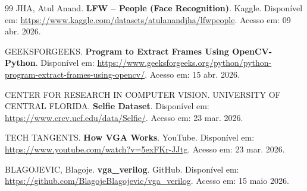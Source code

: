 \begin{thebibliography}{99}
JHA, Atul Anand.
\textbf{LFW -- People (Face Recognition)}.
Kaggle.
Disponível em:
\url{https://www.kaggle.com/datasets/atulanandjha/lfwpeople}.
Acesso em: 09 abr. 2026.

GEEKSFORGEEKS.
\textbf{Program to Extract Frames Using OpenCV-Python}.
Disponível em:
\url{https://www.geeksforgeeks.org/python/python-program-extract-frames-using-opencv/}.
Acesso em: 15 abr. 2026.

CENTER FOR RESEARCH IN COMPUTER VISION.
UNIVERSITY OF CENTRAL FLORIDA.
\textbf{Selfie Dataset}.
Disponível em:
\url{https://www.crcv.ucf.edu/data/Selfie/}.
Acesso em: 23 mar. 2026.

TECH TANGENTS.
\textbf{How VGA Works}.
YouTube.
Disponível em:
\url{https://www.youtube.com/watch?v=5exFKr-JJtg}.
Acesso em: 23 mar. 2026.

BLAGOJEVIC, Blagoje.
\textbf{vga\_verilog}.
GitHub.
Disponível em:
\url{https://github.com/BlagojeBlagojevic/vga_verilog}.
Acesso em: 15 maio 2026.

\end{thebibliography}
